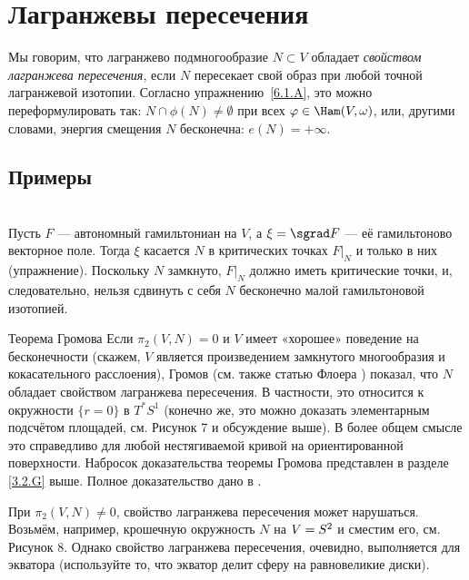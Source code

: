 \section{Лагранжевы пересечения}

Мы говорим, что лагранжево подмногообразие $N \subset V$ обладает \emph{свойством лагранжева пересечения}, если $N$ пересекает свой образ при любой точной лагранжевой изотопии.
Согласно упражнению~\ref{6.1.A}, это можно переформулировать так: $N \cap \phi (N) \ne \emptyset$ при всех $\phi \in \Ham (V, \omega)$, или, другими словами, энергия смещения $N$ бесконечна: $e (N) = + \infty$.

\subsection*{Примеры} 

\begin{ex}{}\\
Пусть $F$ --- автономный гамильтониан на $V$, а $\xi = \sgrad F$ --- её гамильтоново
векторное поле. 
Тогда $\xi$ касается $N$ в критических точках $F|_N$ и только в них
(упражнение). 
Поскольку $N$ замкнуто, $F|_N$ должно иметь критические точки, и,
следовательно, нельзя сдвинуть с себя $N$ бесконечно малой
гамильтоновой изотопией. 
\end{ex}


%
\begin{ex}{Теорема Громова}\label{6.2.B} 
Если $\pi_2 (V, N) = 0$ и $V$ имеет «хорошее» поведение на
бесконечности (скажем, $V$ является произведением замкнутого
многообразия и кокасательного расслоения), Громов \cite{G1} (см. также
статью Флоера \cite{F}) показал, что $N$ обладает свойством лагранжева
пересечения. 
В частности, это относится к окружности $\{r = 0\}$ в $T^\ast S^1$
(конечно же, это можно доказать элементарным подсчётом площадей,
см. Рисунок 7 и обсуждение выше). 
В более общем смысле это справедливо для любой нестягиваемой кривой на
ориентированной поверхности. 
Набросок доказательства теоремы Громова представлен в разделе \ref{3.2.G} выше.
Полное доказательство дано в \cite[Chap. X]{AL}. 

При $\pi_2 (V, N) \ne 0$, свойство лагранжева пересечения может нарушаться.
Возьмём, например, крошечную окружность $N$ на $V \z= S^2$ и сместим его, см. Рисунок 8.
Однако свойство лагранжева пересечения, очевидно, выполняется для экватора (используйте то, что экватор делит сферу на равновеликие диски).
\end{ex}




